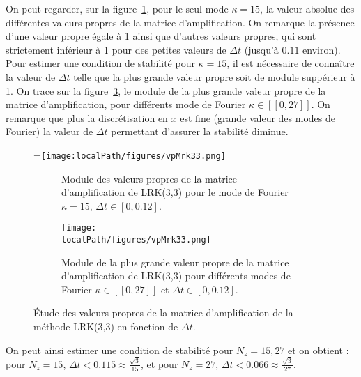 On peut regarder, sur la figure~\ref{fig:3:vpMrk33_k15}, pour le seul mode $\kappa=15$, la valeur absolue des différentes valeurs propres de la matrice d'amplification. On remarque la présence d'une valeur propre égale à 1 ainsi que d'autres valeurs propres, qui sont strictement inférieur à 1 pour des petites valeurs de $\Delta t$ (jusqu'à $0.11$ environ). Pour estimer une condition de stabilité pour $\kappa=15$, il est nécessaire de connaître la valeur de $\Delta t$ telle que la plus grande valeur propre soit de module suppérieur à 1. On trace sur la figure~\ref{fig:3:vpMrk33}, le module de la plus grande valeur propre de la matrice d'amplification, pour différents mode de Fourier $\kappa\in[\![0,27]\!]$. On remarque que plus la discrétisation en $x$ est fine (grande valeur des modes de Fourier) la valeur de $\Delta t$ permettant d'assurer la stabilité diminue.
\begin{figure}[h]
  \centering
  =\hbox{\texttt{[image: \\localPath/figures/vpMrk33.png]}}
  \begin{subfigure}[b]{.45\linewidth}
    \caption{Module des valeurs propres de la matrice d'amplification de LRK(3,3) pour le mode de Fourier $\kappa=15$, $\Delta t\in[0,0.12]$.\\ }
    \label{fig:3:vpMrk33_k15}
  \end{subfigure}
  \begin{subfigure}[b]{.45\linewidth}
    \texttt{[image: \\localPath/figures/vpMrk33.png]}
    \caption{Module de la plus grande valeur propre de la matrice d'amplification de LRK(3,3) pour différents modes de Fourier $\kappa\in[\![0,27]\!]$ et $\Delta t\in[0,0.12]$.}
    \label{fig:3:vpMrk33}
  \end{subfigure}
  \caption{Étude des valeurs propres de la matrice d'amplification de la méthode LRK(3,3) en fonction de $\Delta t$.}
\end{figure}
On peut ainsi estimer une condition de stabilité pour $N_z = 15,27$ et on obtient : pour $N_z = 15$, $\Delta t <0.115 \approx \frac{\sqrt{3}}{15}$, et pour $N_z = 27$, $\Delta t <0.066 \approx \frac{\sqrt{3}}{27}$.

